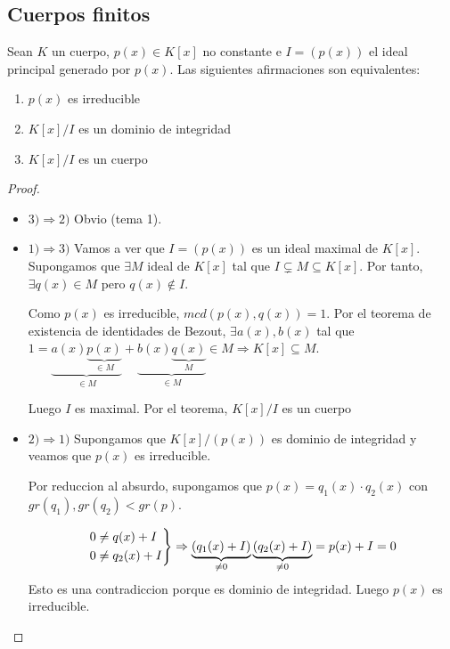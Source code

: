 \subsection{Cuerpos finitos}
\begin{theorem}
	Sean \(K \) un cuerpo, \(p(x ) \in K[x ]\) no constante e \(I = (p(x ))\) el ideal principal generado por \(p(x )\). Las siguientes afirmaciones son equivalentes:
	\begin{enumerate}
		\item \(p(x )\) es irreducible
		\item \(K[x]/I \) es un dominio de integridad
		\item \(K[x]/I \) es un cuerpo
	\end{enumerate}
\end{theorem}
\begin{proof}
	\begin{itemize}
		\item \(3) \Rightarrow 2) \) Obvio (tema 1).
		\item \(1) \Rightarrow 3)\) Vamos a ver que \(I = (p(x ))\) es un ideal maximal de \(K[x ]\). Supongamos que \(\exists  M \) ideal de \(K[x ]\) tal que \(I \subsetneq M \subseteq K[x ]\). Por tanto, \(\exists q(x) \in M \) pero \(q(x) \not\in I \).
		      
		      Como \(p(x )\) es irreducible, \(mcd(p(x),q(x )) = 1\). Por el teorema de existencia de identidades de Bezout, \(\exists a(x), b(x )\) tal que \(1 = \underbrace{a(x) \underbrace{p(x)}_{\in M}}_{\in M} + \underbrace{b(x) \underbrace{q(x)}_{M}}_{\in M} \in M \Rightarrow K[x] \subseteq M\).
		      
		      Luego \(I \) es maximal. Por el teorema, \(K[x]/I \) es un cuerpo
		\item \(2) \Rightarrow 1)\) Supongamos que \(K[x]/(p(x)) \) es dominio de integridad y veamos que \(p(x )\) es irreducible.
		      
		      Por reduccion al absurdo, supongamos que \(p(x) = q_1(x) \cdot q_2(x) \) con \(gr(q_1), gr(q_2) < gr(p )\).
		      
		      \[
			      \begin{rcases}
				      0 \neq q(x) + I \\
				      0 \neq q_2 (x) + I
			      \end{rcases} \Rightarrow \underbrace{(q_1(x) + I)}_{\neq 0} \underbrace{(q_2(x) + I)}_{\neq 0} = p(x) + I = 0
		      \]
		      Esto es una contradiccion porque es dominio de integridad. Luego \(p(x )\) es irreducible.
		      
	\end{itemize}
\end{proof}

